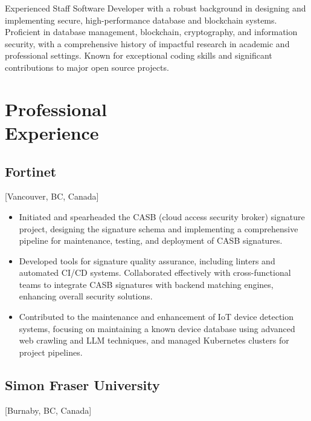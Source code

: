 \documentclass{mycv}
\begin{document}
\maketitle%

\begin{summary}
Experienced Staff Software Developer with a robust background in designing and implementing secure, high-performance database and blockchain systems. Proficient in database management, blockchain, cryptography, and information security, with a comprehensive history of impactful research in academic and professional settings. Known for exceptional coding skills and significant contributions to major open source projects.
\end{summary}

\section{Professional \\ Experience}

\subsection{Fortinet}[Vancouver, BC, Canada]
\begin{positions}
\end{positions}

\begin{itemize}
  \item Initiated and spearheaded the CASB (cloud access security broker) signature project, designing the signature schema and implementing a comprehensive pipeline for maintenance, testing, and deployment of CASB signatures.
  \item Developed tools for signature quality assurance, including linters and automated CI/CD systems. Collaborated effectively with cross-functional teams to integrate CASB signatures with backend matching engines, enhancing overall security solutions.
  \item Contributed to the maintenance and enhancement of IoT device detection systems, focusing on maintaining a known device database using advanced web crawling and LLM techniques, and managed Kubernetes clusters for project pipelines.
\end{itemize}

\subsection{Simon Fraser University}[Burnaby, BC, Canada]
\begin{positions}
\end{positions}
\end{document}
